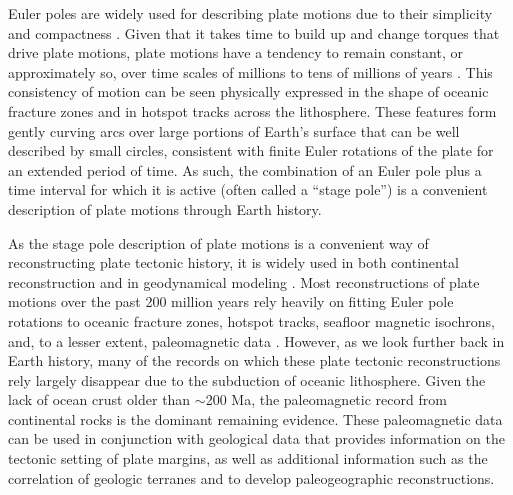 \documentclass[11pt,letterpaper]{article}
\begin{document}
Euler poles are widely used for describing plate motions due to their simplicity and compactness \citep[e.g.][]{DeMets2010a, Argus2011a}. Given that it takes time to build up and change torques that drive plate motions, plate motions have a tendency to remain constant, or approximately so, over time scales of millions to tens of millions of years \citep{Iaffaldano2012a}. This consistency of motion can be seen physically expressed in the shape of oceanic fracture zones and in hotspot tracks across the lithosphere. These features form gently curving arcs over large portions of Earth's surface that can be well described by small circles, consistent with finite Euler rotations of the plate for an extended period of time. As such, the combination of an Euler pole plus a time interval for which it is active (often called a ``stage pole'') is a convenient description of plate motions through Earth history.

As the stage pole description of plate motions is a convenient way of reconstructing plate tectonic history, it is widely used in both continental reconstruction \citep[e.g.][]{Boyden2011a} and in geodynamical modeling \citep[e.g.][]{Mcnamara2005a, Bull2014a}. Most reconstructions of plate motions over the past 200 million years rely heavily on fitting Euler pole rotations to oceanic fracture zones, hotspot tracks, seafloor magnetic isochrons, and, to a lesser extent, paleomagnetic data \citep{Muller1993a, Seton2012a}. However, as we look further back in Earth history, many of the records on which these plate tectonic reconstructions rely largely disappear due to the  subduction of oceanic lithosphere. Given the lack of ocean crust older than $\sim$200 Ma, the paleomagnetic record from continental rocks is the dominant remaining evidence. These paleomagnetic data can be used in conjunction with geological data that provides information on the tectonic setting of plate margins, as well as additional information such as the correlation of geologic terranes and to develop paleogeographic reconstructions.

\end{document}

